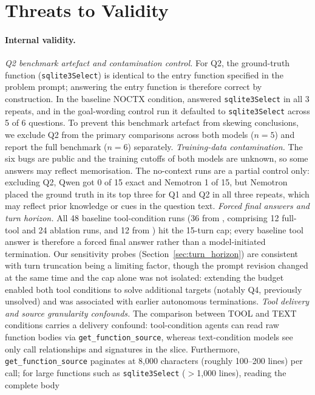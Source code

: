 \section{Threats to Validity}
\label{sec:threats}

\paragraph{Internal validity.}
\emph{Q2 benchmark artefact and contamination control.}
For Q2, the ground-truth function (\texttt{sqlite3Select}) is identical to the entry function
specified in the problem prompt; answering the entry function is therefore correct by construction.
In the baseline \textsc{NOCTX} condition, \qwen answered \texttt{sqlite3Select} in all 3 repeats,
and in the goal-wording control run it defaulted to \texttt{sqlite3Select} across 5 of 6 questions.
To prevent this benchmark artefact from skewing conclusions, we exclude Q2 from the primary
comparisons across both models ($n{=}5$) and report the full benchmark ($n{=}6$) separately.
\emph{Training-data contamination.}
The six bugs are public and the training cutoffs of both models are unknown, so some answers
may reflect memorisation. The no-context runs are a partial control only: excluding Q2, Qwen got
0 of 15 exact and Nemotron 1 of 15, but Nemotron placed the ground truth in its top three for Q1
and Q2 in all three repeats, which may reflect prior knowledge or cues in the question text.
\emph{Forced final answers and turn horizon.}
All 48 baseline tool-condition runs (36 from \qwen{}, comprising 12 full-tool and 24 ablation runs,
and 12 from \nemotron{}) hit the 15-turn cap; every baseline tool answer is
therefore a forced final answer rather than a model-initiated termination.
Our sensitivity probes (Section~\ref{sec:turn_horizon}) are consistent with turn truncation being a limiting factor, though the prompt revision changed at the same time and the cap alone was not isolated: extending the budget enabled both tool conditions to solve additional targets (notably Q4, previously unsolved) and was associated with earlier autonomous terminations.
\emph{Tool delivery and source granularity confounds.}
The comparison between TOOL and TEXT conditions carries a delivery confound:
tool-condition agents can read raw function bodies via \texttt{get\_function\_source},
whereas text-condition models see only call relationships and signatures in the slice.
Furthermore, \texttt{get\_function\_source} paginates at 8{,}000 characters (roughly 100--200 lines) per call;
for large functions such as \texttt{sqlite3Select} ($>$1{,}000 lines), reading the complete body
